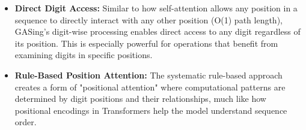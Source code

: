 \begin{itemize}
\item \textbf{\textbf{Direct Digit Access}:} Similar to how self-attention allows any position in a sequence to directly interact with any other position (O(1) path length), GASing's digit-wise processing enables direct access to any digit regardless of its position. This is especially powerful for operations that benefit from examining digits in specific positions.
\end{itemize}

\begin{itemize}
\item \textbf{\textbf{Rule-Based Position Attention}:} The systematic rule-based approach creates a form of "positional attention" where computational patterns are determined by digit positions and their relationships, much like how positional encodings in Transformers help the model understand sequence order.
\end{itemize}

